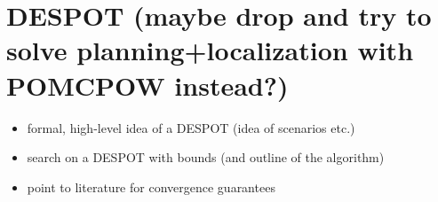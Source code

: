 
\section{DESPOT (maybe drop and try to solve planning+localization with POMCPOW instead?)}

\begin{itemize}
  \item formal, high-level idea of a DESPOT (idea of scenarios etc.)
  \item search on a DESPOT with bounds (and outline of the algorithm)
  \item point to literature for convergence guarantees
\end{itemize}

